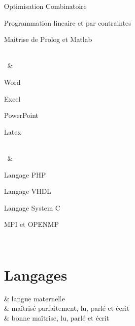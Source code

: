 \documentclass[]{cv-roald}
\begin{document}
\begin{tabularcv}
\begin{tabitemize}
   		\item Optimisation Combinatoire
		\item Programmation lineaire et par contraintes
		\item Maitrise de Prolog et Matlab
   	\end{tabitemize}
   	\\[\vspacepar]
\ & 
\begin{tabitemize}
   		\item Word
		\item Excel
		\item PowerPoint
		\item Latex
   	\end{tabitemize}
   	\\[\vspacepar]
\ & 
\begin{tabitemize}
   		\item Langage PHP
		\item Langage VHDL
		\item Langage System C
		\item MPI et OPENMP
   	\end{tabitemize}
   	\\[\vspacepar]
\end{tabularcv}

\section*{Langages}
\begin{tabularcv}
     & langue maternelle \\[\vspacepar] 
	 & maîtrisé parfaitement, lu, parlé et écrit \\[\vspacepar] 
	 & bonne maîtrise, lu, parlé et écrit \\[\vspacepar] 

\end{tabularcv}
\end{document}
